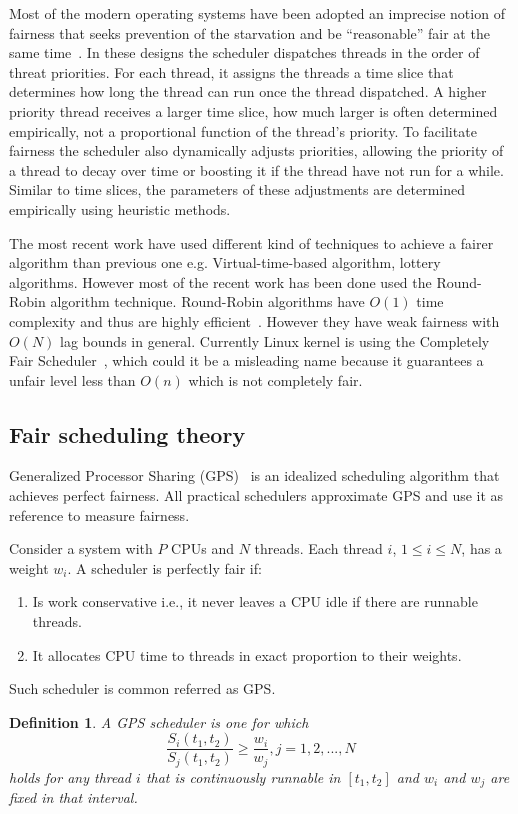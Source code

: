 Most of the modern operating systems have been adopted an imprecise notion of fairness that seeks prevention of the starvation and be ``reasonable'' fair at the same time~\cite{li09}. In these designs the scheduler dispatches threads in the order of threat priorities. For each thread, it assigns the threads a time slice that determines how long the thread can run once the thread dispatched. A higher priority thread receives a larger time slice, how much larger is often determined empirically, not a proportional function of the thread's priority. To facilitate fairness the scheduler also dynamically adjusts priorities, allowing the priority of a thread to decay over time or boosting it if the thread have not run for a while. Similar to time slices, the parameters of these adjustments are determined empirically using heuristic methods. 

The most recent work have used different kind of techniques to achieve a fairer algorithm than previous one e.g. Virtual-time-based algorithm, lottery algorithms. However most of the recent work has been done used the Round-Robin algorithm technique. Round-Robin algorithms have $O(1)$ time complexity and thus are highly efficient~\cite{li09}. However they have weak fairness with $O(N)$ lag bounds in general. Currently Linux kernel is using the Completely Fair Scheduler~\cite{jones09}, which could it be a misleading name because it guarantees a unfair level less than $O(n)$ which is not completely fair. 

\subsection{Fair scheduling theory}
Generalized Processor Sharing (GPS)~\cite{parekh93} is an idealized scheduling algorithm that achieves perfect fairness. All practical schedulers approximate GPS and use it as reference to measure fairness.

Consider a system with $P$ CPUs and $N$ threads. Each thread $i$, $1 \leq i \leq N$, has a weight $w_i$. A scheduler is perfectly fair if:
\begin{enumerate}
	\item Is work conservative i.e., it never leaves a CPU idle if there are runnable threads.
	\item It allocates CPU time to threads in exact proportion to their weights.
\end{enumerate}
Such scheduler is common referred as GPS.

\newtheorem{gps-model}{Definition}
\begin{gps-model}
A GPS scheduler is one for which
$$\frac{S_i(t_1, t_2)}{S_j(t_1, t_2)} \geq \frac{w_i}{w_j}, j=1, 2, ..., N$$
holds for any thread $i$ that is continuously runnable in $[t_1, t_2]$ and $w_i$ and $w_j$ are fixed in that interval. 
\end{gps-model}

